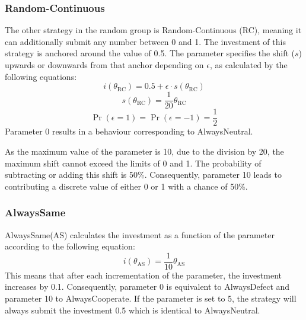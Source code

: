 \documentclass[11pt]{article}
\begin{document}
\subsubsection*{Random-Continuous}
The other strategy in the random group is Random-Continuous (RC), meaning it can additionally submit any number between 0 and 1.
The investment of this strategy is anchored around the value of 0.5.
The parameter specifies the shift ($s$) upwards or downwards from that anchor depending on $\epsilon$, as calculated by the following equations:
\begin{equation}
	i(\theta_{\mathrm{RC}}) = 0.5 + \epsilon \cdot s(\theta_{\mathrm{RC}})
	\label{eq:RC_i_eq}
\end{equation}
\begin{equation}
	s(\theta_{\mathrm{RC}}) = \frac{1}{20} {\theta_{\mathrm{RC}}}
	\label{eq:RC_s_eq}
\end{equation}
\begin{equation}
	\Pr(\epsilon = 1) = \Pr(\epsilon = -1) = \frac{1}{2}
	\label{eq:RC_e_prob}
\end{equation}
Parameter 0 results in a behaviour corresponding to AlwaysNeutral.

As the maximum value of the parameter is 10, due to the division by 20, the maximum shift cannot exceed the limits of 0 and 1.
The probability of subtracting or adding this shift is 50\%.
Consequently, parameter 10 leads to contributing a discrete value of either 0 or 1 with a chance of 50\%. 


\subsubsection*{AlwaysSame}
AlwaysSame(AS) calculates the investment as a function of the parameter according to the following equation: 
\begin{equation}
	i(\theta_{\mathrm{AS}}) = \frac{1}{10} \theta_{\mathrm{AS}}
	\label{eq:AS_i_eq}
\end{equation}
This means that after each incrementation of the parameter, the investment increases by 0.1.
Consequently, parameter 0 is equivalent to AlwaysDefect and parameter 10 to AlwaysCooperate.
If the parameter is set to 5, the strategy will always submit the investment 0.5 which is identical to AlwaysNeutral.
\end{document}
